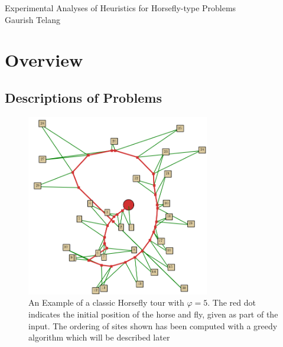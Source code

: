 \documentclass[12pt]{report}
\begin{document}
\begin{titlepage}
	\centering
        {\Huge Experimental Analyses of Heuristics for Horsefly-type Problems\\}
        \vspace{20mm}
        {\Large Gaurish Telang}
\end{titlepage}
\setcounter{page}{2} 

\setcounter{tocdepth}{1}
\tableofcontents
{}

\part{Overview}
\chapter{Descriptions of Problems}
\label{chap:descriptions-of-problems}


\begin{figure}[H]
  \centering

  \includegraphics[width=8cm]{../webs/docs/prelim_example_phi5.png}
  \caption{An Example of a classic Horsefly tour with $\varphi=5$. The red dot
    indicates the initial position of the horse and fly, given as part of 
    the input. The ordering of sites shown has been computed with a greedy 
    algorithm which will be described later}
  \label{fig:prelim-example}
\end{figure}
\end{document}
